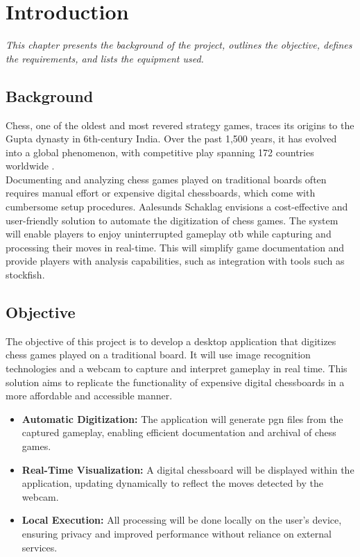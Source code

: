 \chapter{Introduction}

\begin{center} 
\textit{This chapter presents the background of the project, outlines the objective, defines the requirements, and lists the equipment used.}
\end{center}


\section{Background}

Chess, one of the oldest and most revered strategy games, traces its origins to the Gupta dynasty in 6th-century India. Over the past 1,500 years, it has evolved into a global phenomenon, with competitive play spanning 172 countries worldwide \cite{artsnculture}. \\

Documenting and analyzing chess games played on traditional boards often requires manual effort or expensive digital chessboards, which come with cumbersome setup procedures. Aalesunds Schaklag envisions a cost-effective and user-friendly solution to automate the digitization of chess games.  The system will enable players to enjoy uninterrupted gameplay \gls{otb} while capturing and processing their moves in real-time. This will simplify game documentation and provide players with analysis capabilities, such as integration with tools such as \gls{stockfish}.

\section{Objective}

The objective of this project is to develop a desktop application that digitizes chess games played on a traditional board. It will use image recognition technologies and a webcam to capture and interpret gameplay in real time. This solution aims to replicate the functionality of expensive digital chessboards in a more affordable and accessible manner.


\begin{itemize}
    \item \textbf{Automatic Digitization:} The application will generate \gls{pgn} files from the captured gameplay, enabling efficient documentation and archival of chess games.

    \item \textbf{Real-Time Visualization:} A digital chessboard will be displayed within the application, updating dynamically to reflect the moves detected by the webcam.

    \item \textbf{Local Execution:} All processing will be done locally on the user’s device,
    ensuring privacy and improved performance without reliance on external
    services.
\end{itemize}


